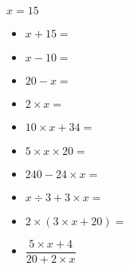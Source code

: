 \begin{multicols}{3}
    $x = 15$ 
    
    \begin{itemize}[label={$\bullet$}]
      \item $x + 15 = $ \dotfill
      \item $x - 10 = $ \dotfill
      \item $20 - x = $ \dotfill
      \item $2 \times x = $ \dotfill
      \item $10 \times x + 34 = $ \dotfill
      \item $5 \times  x \times 20 = $ \dotfill
      \item $240 - 24 \times x = $ \dotfill
      \item $x \div 3 + 3 \times x = $ \dotfill
      \item $2 \times (3  \times x + 20) = $ \dotfill
      \item $\dfrac{5 \times x + 4}{20 + 2 \times x}$ \dotfill
    \end{itemize}
    
  \end{multicols}  

